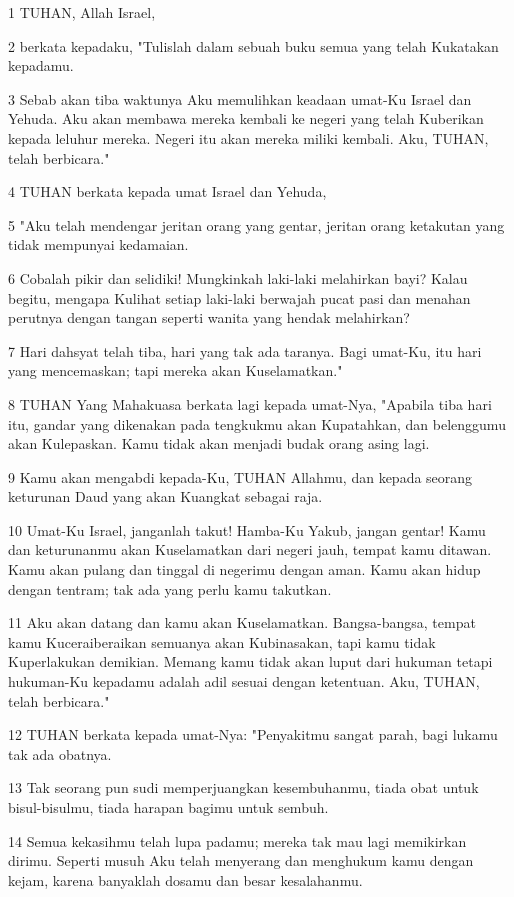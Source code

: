 \par 1 TUHAN, Allah Israel,
\par 2 berkata kepadaku, "Tulislah dalam sebuah buku semua yang telah Kukatakan kepadamu.
\par 3 Sebab akan tiba waktunya Aku memulihkan keadaan umat-Ku Israel dan Yehuda. Aku akan membawa mereka kembali ke negeri yang telah Kuberikan kepada leluhur mereka. Negeri itu akan mereka miliki kembali. Aku, TUHAN, telah berbicara."
\par 4 TUHAN berkata kepada umat Israel dan Yehuda,
\par 5 "Aku telah mendengar jeritan orang yang gentar, jeritan orang ketakutan yang tidak mempunyai kedamaian.
\par 6 Cobalah pikir dan selidiki! Mungkinkah laki-laki melahirkan bayi? Kalau begitu, mengapa Kulihat setiap laki-laki berwajah pucat pasi dan menahan perutnya dengan tangan seperti wanita yang hendak melahirkan?
\par 7 Hari dahsyat telah tiba, hari yang tak ada taranya. Bagi umat-Ku, itu hari yang mencemaskan; tapi mereka akan Kuselamatkan."
\par 8 TUHAN Yang Mahakuasa berkata lagi kepada umat-Nya, "Apabila tiba hari itu, gandar yang dikenakan pada tengkukmu akan Kupatahkan, dan belenggumu akan Kulepaskan. Kamu tidak akan menjadi budak orang asing lagi.
\par 9 Kamu akan mengabdi kepada-Ku, TUHAN Allahmu, dan kepada seorang keturunan Daud yang akan Kuangkat sebagai raja.
\par 10 Umat-Ku Israel, janganlah takut! Hamba-Ku Yakub, jangan gentar! Kamu dan keturunanmu akan Kuselamatkan dari negeri jauh, tempat kamu ditawan. Kamu akan pulang dan tinggal di negerimu dengan aman. Kamu akan hidup dengan tentram; tak ada yang perlu kamu takutkan.
\par 11 Aku akan datang dan kamu akan Kuselamatkan. Bangsa-bangsa, tempat kamu Kuceraiberaikan semuanya akan Kubinasakan, tapi kamu tidak Kuperlakukan demikian. Memang kamu tidak akan luput dari hukuman tetapi hukuman-Ku kepadamu adalah adil sesuai dengan ketentuan. Aku, TUHAN, telah berbicara."
\par 12 TUHAN berkata kepada umat-Nya: "Penyakitmu sangat parah, bagi lukamu tak ada obatnya.
\par 13 Tak seorang pun sudi memperjuangkan kesembuhanmu, tiada obat untuk bisul-bisulmu, tiada harapan bagimu untuk sembuh.
\par 14 Semua kekasihmu telah lupa padamu; mereka tak mau lagi memikirkan dirimu. Seperti musuh Aku telah menyerang dan menghukum kamu dengan kejam, karena banyaklah dosamu dan besar kesalahanmu.
